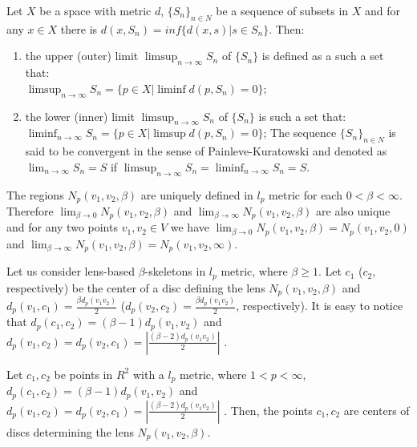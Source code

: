\documentclass[11pt]{llncs}
\begin{document}
\begin{definition}
\label{kuratowskiconv}
Let $X$ be a space with metric $d$, $ \{ S_n \}_{ n \in N}$ be a sequence 
of subsets in $X$ and for any $x \in X$ there is $d(x,S_n)=inf\{d(x,s)|s \in S_n\}$. Then:
\begin{enumerate}
\item
the upper (outer) limit $\limsup_{n \rightarrow \infty} S_n$ of $\{S_n\}$ 
is defined as a such a set that:\\
$\limsup_{n \rightarrow \infty} S_n=\{p \in X| \liminf d(p, S_n)=0\}$;
\item
the lower (inner) limit 
$\limsup_{n \rightarrow \infty} S_n$ of $\{S_n\}$ is such a set that:\\
$\liminf_{n \rightarrow \infty} S_n=\{p \in X| \limsup d(p, S_n)=0 \}$;
The sequence $ \{ S_n \}_{ n \in N}$ is said to be convergent in the sense of Painleve-Kuratowski
and denoted as $\lim_{n \rightarrow \infty} S_n =S$ 
if $\limsup_{n \rightarrow \infty} S_n=\liminf_{n \rightarrow \infty} S_n = S$.
\end{enumerate}
\end{definition}







The regions $N_{p}(v_1,v_2,\beta)$ are uniquely defined in $l_p$ metric for each $0 < \beta < \infty$.
Therefore $\lim_{\beta \rightarrow 0} N_p(v_1,v_2, \beta)$ and 
$\lim_{\beta \rightarrow \infty} N_p(v_1,v_2, \beta)$ are also unique and
for any two points $v_1,v_2 \in V$ we have 
$\lim_{\beta \rightarrow 0} N_p(v_1,v_2, \beta)=N_p(v_1,v_2,0)$ and 
$\lim_{\beta \rightarrow \infty} N_p(v_1,v_2, \beta)=N_p(v_1,v_2, \infty)$.


Let us consider lens-based $\beta$-skeletons in $l_p$ metric, where $\beta \geq 1$. 
Let $c_1$ ($c_2$, respectively) be the center of a disc defining the lens $N_{p}(v_1, v_2,\beta)$ 
and $d_p(v_1, c_1)=\frac{\beta d_p(v_1v_2)}{2}$  ($d_p(v_2, c_2)=\frac{\beta d_p(v_1v_2)}{2}$, 
respectively). 
It is easy to notice that $d_p(c_1, c_2)=(\beta -1)d_p(v_1,v_2)$ 
and $d_p(v_1, c_2)=d_p(v_2,c_1)=|\frac{(\beta -2) d_p(v_1v_2)}{2}|$ .

\begin{lemma}
\label{lemata}
Let $c_1, c_2$ be points in $R^2$ with a $l_p$ metric, where $1<p<\infty$,
$d_p(c_1, c_2)=(\beta -1)d_p(v_1,v_2)$ and 
$d_p(v_1, c_2)=d_p(v_2,c_1)=|\frac{(\beta -2) d_p(v_1v_2)}{2}|$ . 
Then, the points $c_1, c_2$ are centers of discs determining the lens $N_{p}(v_1, v_2,\beta)$.
\end{lemma}
\end{document}
